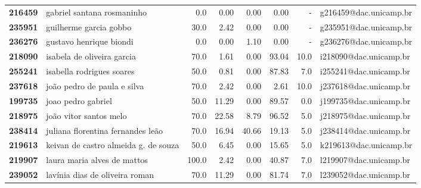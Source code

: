 \documentclass[11pt]{article}
\begin{document}
\begin{center}
\begin{landscape}
\begin{longtable}{llrrrrrl}
\textbf{216459} &            gabriel santana rosmaninho &                   0.0 &        0.00 &        0.00 &        0.00 &                        - &  g216459@dac.unicamp.br \\
\textbf{235951} &                guilherme garcia gobbo &                  30.0 &        2.42 &        0.00 &        0.00 &                        - &  g235951@dac.unicamp.br \\
\textbf{236276} &               gustavo henrique biondi &                   0.0 &        0.00 &        1.10 &        0.00 &                        - &  g236276@dac.unicamp.br \\
\textbf{218090} &            isabela de oliveira garcia &                  70.0 &        1.61 &        0.00 &       93.04 &                     10.0 &  i218090@dac.unicamp.br \\
\textbf{255241} &             isabella rodrigues soares &                  50.0 &        0.81 &        0.00 &       87.83 &                      7.0 &  i255241@dac.unicamp.br \\
\textbf{237618} &           joão pedro de paula e silva &                  70.0 &        2.42 &        0.00 &        2.61 &                     10.0 &  j237618@dac.unicamp.br \\
\textbf{199735} &                    joao pedro gabriel &                  50.0 &       11.29 &        0.00 &       89.57 &                      0.0 &  j199735@dac.unicamp.br \\
\textbf{218975} &                joão vitor santos melo &                  70.0 &       22.58 &        8.79 &       96.52 &                      5.0 &  j218975@dac.unicamp.br \\
\textbf{238414} &     juliana florentina fernandes leão &                  70.0 &       16.94 &       40.66 &       19.13 &                      5.0 &  j238414@dac.unicamp.br \\
\textbf{219613} &  keivan de castro almeida g. de souza &                  50.0 &        6.45 &        0.00 &       15.65 &                      5.0 &  k219613@dac.unicamp.br \\
\textbf{219907} &           laura maria alves de mattos &                 100.0 &        2.42 &        0.00 &       40.87 &                      7.0 &  l219907@dac.unicamp.br \\
\textbf{239052} &        lavínia dias de oliveira roman &                  70.0 &       11.29 &        0.00 &       81.74 &                      7.0 &  l239052@dac.unicamp.br \\

\end{longtable}
\end{landscape}
\end{center}
\end{document}
